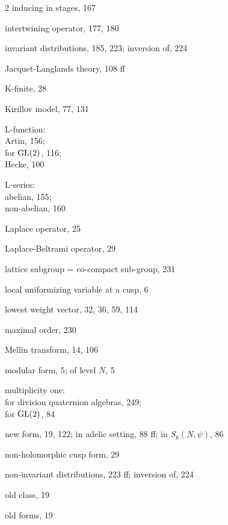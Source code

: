 \begin{multicols}{2}
\noindent inducing in stages, 167\par
\noindent intertwining operator, 177, 180\par
\noindent invariant distributions, 185, 223; inversion of, 224\par
\noindent Jacquet-Langlands theory, 108 ff\par
\noindent K-finite, 28\par
\noindent Kirillov model, 77, 131\par
\noindent L-function:\\
\hspace*{1em}Artin, 156;\\
\hspace*{1em}for $\operatorname{GL}(2)$, 116;\\
\hspace*{1em}Hecke, 100\par
\noindent L-series:\\
\hspace*{1em}abelian, 155;\\
\hspace*{1em}non-abelian, 160\par
\noindent Laplace operator, 25\par
\noindent Laplace-Beltrami operator, 29\par
\noindent lattice subgroup = co-compact sub-group, 231\par
\noindent local uniformizing variable at a cusp, 6\par
\noindent lowest weight vector, 32, 36, 59, 114\par
\noindent maximal order, 230\par
\noindent Mellin transform, 14, 106\par
\noindent modular form, 5; of level $N$, 5\par
\noindent multiplicity one:\\
\hspace*{1em}for division quaternion algebras, 249;\\
\hspace*{1em}for $\operatorname{GL}(2)$, 84\par
\noindent new form, 19, 122; in adelic setting, 88 ff; in $S_k(N,\psi)$, 86\par
\noindent non-holomorphic cusp form, 29\par
\noindent non-invariant distributions, 223 ff; inversion of, 224\par
\noindent old class, 19\par
\noindent old forms, 19\par

\end{multicols}
